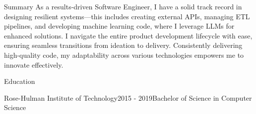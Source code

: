 \documentclass{resume} %
\begin{document}
\begin{rSection}{Summary}
{As a results-driven Software Engineer, I have a solid track record in designing resilient systems—this includes creating external APIs, managing ETL pipelines, and developing machine learning code, where I leverage LLMs for enhanced solutions. I navigate the entire product development lifecycle with ease, ensuring seamless transitions from ideation to delivery. Consistently delivering high-quality code, my adaptability across various technologies empowers me to innovate effectively.}
\end{rSection}

\begin{rSection}{Education}
\begin{rsemisection}{Rose-Hulman Institute of Technology}{2015 - 2019}{Bachelor of Science in Computer Science}
\end{rsemisection}
\end{rSection}
\end{document}
